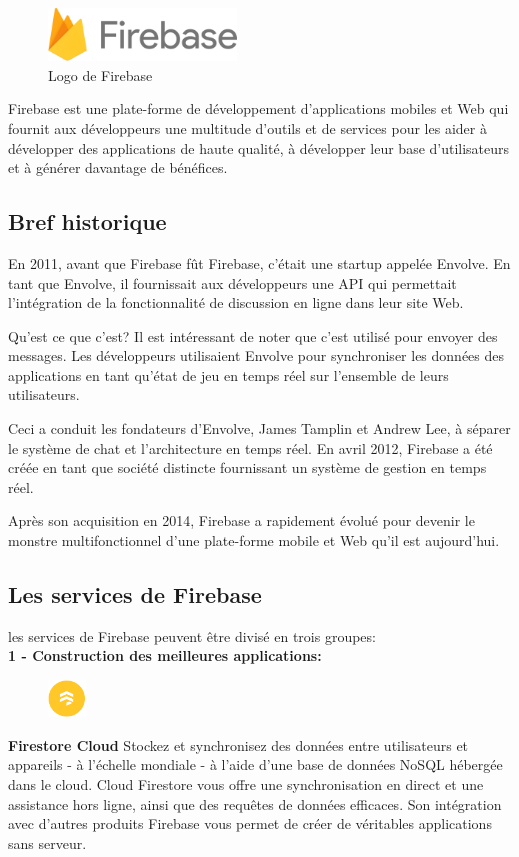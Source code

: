 \begin{figure}
	\includegraphics[width=5cm]{Images/chapter2/firebase_logo.png}
	\caption{{\footnotesize Logo de Firebase}}
\end{figure}

Firebase est une plate-forme de développement d'applications mobiles et Web qui fournit aux développeurs une multitude d'outils et de services pour les aider à développer des applications de haute qualité, à développer leur base d'utilisateurs et à générer davantage de bénéfices.\cite{geekyants_introduction_2017}
\newpage

\subsection{Bref historique}
En 2011, avant que Firebase fût Firebase, c'était une startup appelée Envolve. En tant que Envolve, il fournissait aux développeurs une \gls{API} qui permettait l'intégration de la fonctionnalité de discussion en ligne dans leur site Web.

Qu'est ce que c'est? Il est intéressant de noter que c'est utilisé pour envoyer des messages. Les développeurs utilisaient Envolve pour synchroniser les données des applications en tant qu'état de jeu en temps réel sur l'ensemble de leurs utilisateurs.

Ceci a conduit les fondateurs d’Envolve, James Tamplin et Andrew Lee, à séparer le système de chat et l’architecture en temps réel. En avril 2012, Firebase a été créée en tant que société distincte fournissant un système de gestion en temps réel.

Après son acquisition en 2014, Firebase a rapidement évolué pour devenir le monstre multifonctionnel d’une plate-forme mobile et Web qu’il est aujourd’hui.

\subsection{Les services de Firebase}
les services de Firebase peuvent être divisé en trois groupes:\bigskip\\
\longtab \textbf{1 - Construction des meilleures applications:}\bigskip

\begin{figure}
	\includegraphics[width=1cm]{Images/chapter2/firebase_services/firestore.png}
\end{figure}
\textbf{Firestore Cloud} Stockez et synchronisez des données entre utilisateurs et appareils - à l'échelle mondiale - à l'aide d'une base de données NoSQL hébergée dans le cloud. Cloud Firestore vous offre une synchronisation en direct et une assistance hors ligne, ainsi que des requêtes de données efficaces. Son intégration avec d'autres produits Firebase vous permet de créer de véritables applications sans serveur.\medskip

